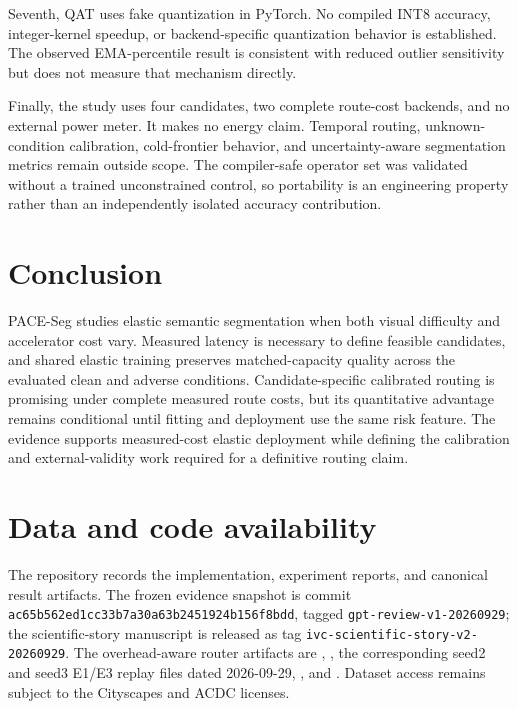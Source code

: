 \documentclass[a4paper,review,12pt]{elsarticle}
\newcommand{\method}{PACE-Seg}
\begin{document}
Seventh, QAT uses fake quantization in PyTorch. No compiled INT8 accuracy, integer-kernel speedup, or backend-specific quantization behavior is established. The observed EMA-percentile result is consistent with reduced outlier sensitivity but does not measure that mechanism directly.

Finally, the study uses four candidates, two complete route-cost backends, and no external power meter. It makes no energy claim. Temporal routing, unknown-condition calibration, cold-frontier behavior, and uncertainty-aware segmentation metrics remain outside scope. The compiler-safe operator set was validated without a trained unconstrained control, so portability is an engineering property rather than an independently isolated accuracy contribution.

\section{Conclusion}
\label{sec:conclusion}

\method{} studies elastic semantic segmentation when both visual difficulty and accelerator cost vary. Measured latency is necessary to define feasible candidates, and shared elastic training preserves matched-capacity quality across the evaluated clean and adverse conditions. Candidate-specific calibrated routing is promising under complete measured route costs, but its quantitative advantage remains conditional until fitting and deployment use the same risk feature. The evidence supports measured-cost elastic deployment while defining the calibration and external-validity work required for a definitive routing claim.

\section*{Data and code availability}

The repository records the implementation, experiment reports, and canonical result artifacts. The frozen evidence snapshot is commit \texttt{ac65b562ed1cc33b7a30a63b2451924b156f8bdd}, tagged \texttt{gpt-review-v1-20260929}; the scientific-story manuscript is released as tag \texttt{ivc-scientific-story-v2-20260929}. The overhead-aware router artifacts are , , the corresponding seed2 and seed3 E1/E3 replay files dated 2026-09-29, , and . Dataset access remains subject to the Cityscapes and ACDC licenses.
\end{document}
